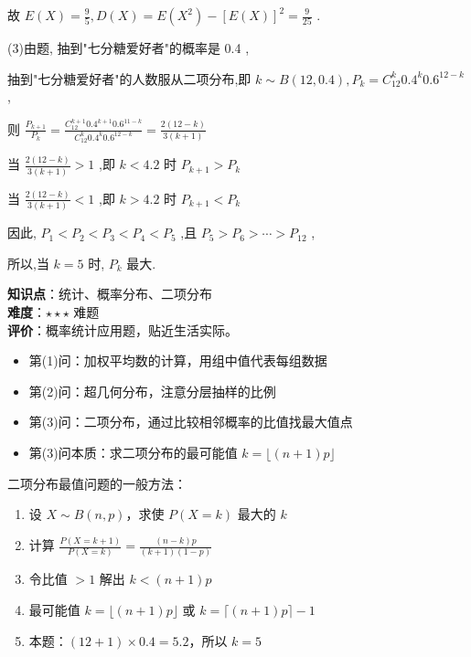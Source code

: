 \documentclass[10pt]{article}
\begin{document}
故 \(E(X) = \frac{9}{5}, D(X) = E(X^2) - [E(X)]^2 = \frac{9}{25}\) .

(3)由题, 抽到"七分糖爱好者"的概率是 0.4 ,

抽到"七分糖爱好者"的人数服从二项分布,即 \(k \sim B(12, 0.4) , P_k = C_{12}^k 0.4^k 0.6^{12-k}\) ,

则 \(\frac{P_{k+1}}{P_k} = \frac{C_{12}^{k+1} 0.4^{k+1} 0.6^{11-k}}{C_{12}^k 0.4^k 0.6^{12-k}} = \frac{2(12-k)}{3(k+1)}\)

当 \(\frac{2(12-k)}{3(k+1)} > 1\) ,即 \(k < 4.2\) 时 \(P_{k+1} > P_k\)

当 \(\frac{2(12-k)}{3(k+1)} < 1\) ,即 \(k > 4.2\) 时 \(P_{k+1} < P_k\)

因此, \(P_1 < P_2 < P_3 < P_4 < P_5\) ,且 \(P_5 > P_6 > \cdots > P_{12}\) ,

所以,当 \(k = 5\) 时, \(P_k\) 最大.

\begin{analysisbox}[考点分析]
\textbf{知识点}：统计、概率分布、二项分布\\
\textbf{难度}：\(\star\star\star\) 难题\\
\textbf{评价}：概率统计应用题，贴近生活实际。
\begin{itemize}
\item 第(1)问：加权平均数的计算，用组中值代表每组数据
\item 第(2)问：超几何分布，注意分层抽样的比例
\item 第(3)问：二项分布，通过比较相邻概率的比值找最大值点
\item 第(3)问本质：求二项分布的最可能值 \(k = \lfloor (n+1)p \rfloor\)
\end{itemize}
\end{analysisbox}

\begin{tipbox}[教学提示]
二项分布最值问题的一般方法：
\begin{enumerate}
\item 设 \(X \sim B(n, p)\)，求使 \(P(X=k)\) 最大的 \(k\)
\item 计算 \(\frac{P(X=k+1)}{P(X=k)} = \frac{(n-k)p}{(k+1)(1-p)}\)
\item 令比值 \(> 1\) 解出 \(k < (n+1)p\)
\item 最可能值 \(k = \lfloor (n+1)p \rfloor\) 或 \(k = \lceil (n+1)p \rceil - 1\)
\item 本题：\((12+1) \times 0.4 = 5.2\)，所以 \(k = 5\)
\end{enumerate}
\end{tipbox}

\newpage
\end{document}
